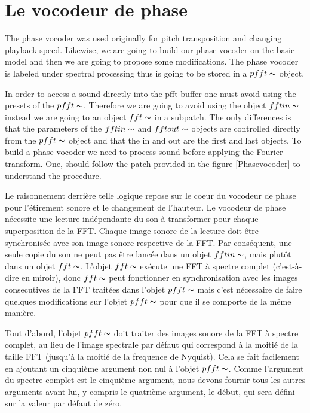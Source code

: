 \section{Le vocodeur de phase}

The phase vocoder was used originally for pitch transposition and changing playback speed. Likewise, we are going to build our phase vocoder on the basic model and then we are going to propose some modifications. The phase vocoder is labeled under spectral processing thus is going to be stored in a $pfft\thicksim$ object.

In order to access a sound directly into the pfft buffer one must avoid using the presets of the $pfft\thicksim$. Therefore we are going to avoid using the object $fftin\thicksim$ instead we are going to an object $fft\thicksim$ in a subpatch. The only differences is that the parameters of the $fftin\thicksim$ and $fftout\thicksim$ objects are controlled directly from the $pfft\thicksim$ object and that the in and out are the first and last objects. To build a phase vocoder we need to process sound before applying the Fourier transform. One, should follow the patch provided in the figure \ref{Phasevocoder} to understand the procedure.

Le raisonnement derrière telle logique repose sur le coeur du vocodeur de phase pour l'étirement sonore et le changement de l'hauteur. Le vocodeur de phase nécessite une lecture indépendante du son à transformer pour chaque superposition de la FFT. Chaque image sonore de la lecture doit être synchronisée avec son image sonore respective de la FFT. Par conséquent, une seule copie du son ne peut pas être lancée dans un objet $fftin\thicksim$, mais plutôt dans un objet $fft\thicksim$. L'objet $fft\thicksim$ exécute une FFT à spectre complet (c'est-à-dire en miroir), donc $fft\thicksim$ peut fonctionner en synchronisation avec les images consecutives de la FFT traitées dans l'objet $pfft\thicksim$ mais c'est nécessaire de faire quelques modifications sur l'objet $pfft\thicksim$ pour que il se comporte de la même manière.

Tout d'abord, l'objet $pfft\thicksim$ doit traiter des images sonore de la FFT à spectre complet, au lieu de l'image spectrale par défaut qui correspond à la moitié de la taille FFT (jusqu'à la moitié de la frequence de Nyquist). Cela se fait facilement en ajoutant un cinquième argument non nul à l'objet $pfft\thicksim$. Comme l'argument du spectre complet est le cinquième argument, nous devons fournir tous les autres arguments avant lui, y compris le quatrième argument, le début, qui sera défini sur la valeur par défaut de zéro.

